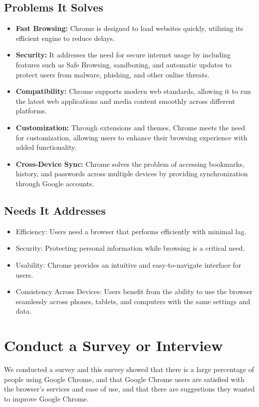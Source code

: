 \documentclass[a4paper,12pt]{article}
\begin{document}
\subsection{Problems It Solves}
\begin{itemize}
    \item \textbf{Fast Browsing:} Chrome is designed to load websites quickly, utilizing its efficient engine to reduce delays.
    \item \textbf{Security:} It addresses the need for secure internet usage by including features such as Safe Browsing, sandboxing, and automatic updates to protect users from malware, phishing, and other online threats.
    \item \textbf{Compatibility:} Chrome supports modern web standards, allowing it to run the latest web applications and media content smoothly across different platforms.
    \item \textbf{Customization:} Through extensions and themes, Chrome meets the need for customization, allowing users to enhance their browsing experience with added functionality.
    \item \textbf{Cross-Device Sync:} Chrome solves the problem of accessing bookmarks, history, and passwords across multiple devices by providing synchronization through Google accounts.
\end{itemize}

\subsection{Needs It Addresses}
\begin{itemize}
    \item Efficiency: Users need a browser that performs efficiently with minimal lag.
    \item Security: Protecting personal information while browsing is a critical need.
    \item Usability: Chrome provides an intuitive and easy-to-navigate interface for users.
    \item Consistency Across Devices: Users benefit from the ability to use the browser seamlessly across phones, tablets, and computers with the same settings and data.
\end{itemize}

\section{Conduct a Survey or Interview}
We conducted a survey and this survey showed that there is a large percentage of people using Google Chrome, and that Google Chrome users are satisfied with the browser’s services and ease of use, and that there are suggestions they wanted to improve Google Chrome.
\end{document}

